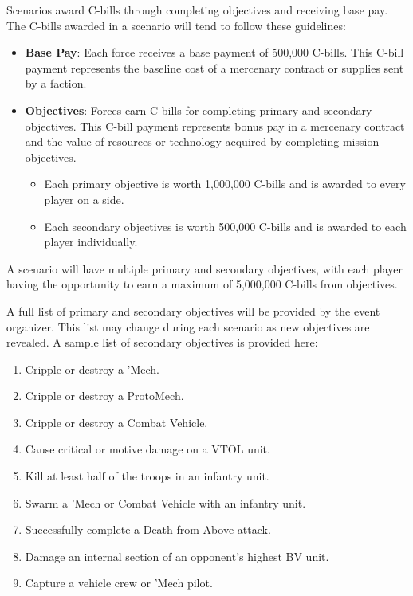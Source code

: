 Scenarios award C-bills through completing objectives and receiving base pay.
The C-bills awarded in a scenario will tend to follow these guidelines:

\begin{itemize}

\item {\bfseries Base Pay}: Each force receives a base payment of 500,000 C-bills.
This C-bill payment represents the baseline cost of a mercenary contract or supplies sent by a faction.

\item {\bfseries Objectives}: Forces earn C-bills for completing primary and secondary objectives.
This C-bill payment represents bonus pay in a mercenary contract and the value of resources or technology acquired by completing mission objectives.

\begin{itemize}

\item Each primary objective is worth 1,000,000 C-bills and is awarded to every player on a side.

\item Each secondary objectives is worth 500,000 C-bills and is awarded to each player individually.

\end{itemize}

\end{itemize}

A scenario will have multiple primary and secondary objectives, with each player having the opportunity to earn a maximum of 5,000,000 C-bills from objectives.

A full list of primary and secondary objectives will be provided by the event organizer.
This list may change during each scenario as new objectives are revealed.
A sample list of secondary objectives is provided here:

\begin{enumerate}

\item Cripple or destroy a 'Mech.

\item Cripple or destroy a ProtoMech.

\item Cripple or destroy a Combat Vehicle.

\item Cause critical or motive damage on a VTOL unit.

\item Kill at least half of the troops in an infantry unit.

\item Swarm a 'Mech or Combat Vehicle with an infantry unit.

\item Successfully complete a Death from Above attack.

\item Damage an internal section of an opponent's highest BV unit.

\item Capture a vehicle crew or 'Mech pilot.

\end{enumerate}
